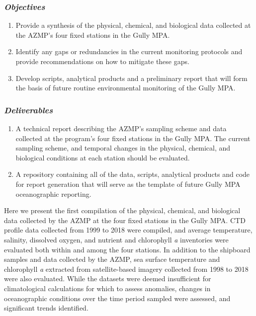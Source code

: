 \documentclass[12pt]{article}\usepackage[]{graphicx}\usepackage[]{color}
\begin{document}
\hypertarget{objectives}{%
\subsubsection{\texorpdfstring{\emph{Objectives}}{Objectives}}\label{objectives}}
\begin{enumerate}
\def\labelenumi{\arabic{enumi}.}
\item
  Provide a synthesis of the physical, chemical, and biological data collected at the AZMP's four fixed stations in the Gully MPA.
\item
  Identify any gaps or redundancies in the current monitoring protocols and provide recommendations on how to mitigate these gaps.
\item
  Develop scripts, analytical products and a preliminary report that will form the basis of future routine environmental monitoring of the Gully MPA.
\end{enumerate}
\hypertarget{deliverables}{%
\subsubsection{\texorpdfstring{\emph{Deliverables}}{Deliverables}}\label{deliverables}}
\begin{enumerate}
\def\labelenumi{\arabic{enumi}.}
\item
  A technical report describing the AZMP's sampling scheme and data collected at the program's four fixed stations in the Gully MPA. The current sampling scheme, and temporal changes in the physical, chemical, and biological conditions at each station should be evaluated.
\item
  A repository containing all of the data, scripts, analytical products and code for report generation that will serve as the template of future Gully MPA oceanographic reporting.
\end{enumerate}
Here we present the first compilation of the physical, chemical, and biological data collected by the AZMP at the four fixed stations in the Gully MPA. CTD profile data collected from 1999 to 2018 were compiled, and average temperature, salinity, dissolved oxygen, and nutrient and chlorophyll \emph{a} inventories were evaluated both within and among the four stations. In addition to the shipboard samples and data collected by the AZMP, sea surface temperature and chlorophyll \emph{a} extracted from satellite-based imagery collected from 1998 to 2018 were also evaluated. While the datasets were deemed insufficient for climatological calculations for which to assess anomalies, changes in oceanographic conditions over the time period sampled were assessed, and significant trends identified.
\end{document}
